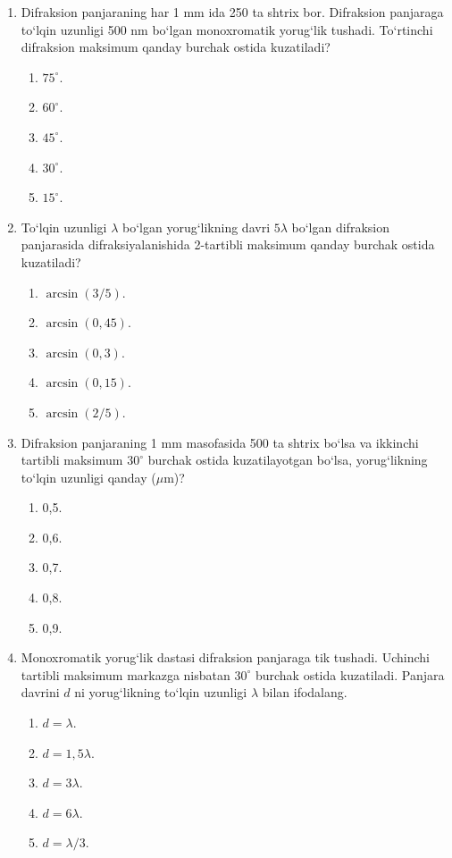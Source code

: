 \begin{enumerate}
\item Difraksion panjaraning har 1 mm ida 250 ta shtrix bor. Difraksion panjaraga to‘lqin uzunligi 500 nm bo‘lgan monoxromatik yorug‘lik tushadi. To‘rtinchi difraksion maksimum qanday burchak ostida kuzatiladi?
\begin{enumerate}[label=\Alph*)]
\item $75^\circ$.
\item $60^\circ$.
\item $45^\circ$.
\item $30^\circ$.
\item $15^\circ$.
\end{enumerate}

\item To‘lqin uzunligi $\lambda$ bo‘lgan yorug‘likning davri $5\lambda$ bo‘lgan difraksion panjarasida difraksiyalanishida 2-tartibli maksimum qanday burchak ostida kuzatiladi?
\begin{enumerate}[label=\Alph*)]
\item $\arcsin(3/5)$.
\item $\arcsin(0{,}45)$.
\item $\arcsin(0{,}3)$.
\item $\arcsin(0{,}15)$.
\item $\arcsin(2/5)$.
\end{enumerate}

\item Difraksion panjaraning 1 mm masofasida 500 ta shtrix bo‘lsa va ikkinchi tartibli maksimum $30^\circ$ burchak ostida kuzatilayotgan bo‘lsa, yorug‘likning to‘lqin uzunligi qanday ($\mu$m)?
\begin{enumerate}[label=\Alph*)]
\item 0,5.
\item 0,6.
\item 0,7.
\item 0,8.
\item 0,9.
\end{enumerate}

\item Monoxromatik yorug‘lik dastasi difraksion panjaraga tik tushadi. Uchinchi tartibli maksimum markazga nisbatan $30^\circ$ burchak ostida kuzatiladi. Panjara davrini $d$ ni yorug‘likning to‘lqin uzunligi $\lambda$ bilan ifodalang.
\begin{enumerate}[label=\Alph*)]
\item $d=\lambda$.
\item $d=1{,}5\lambda$.
\item $d=3\lambda$.
\item $d=6\lambda$.
\item $d=\lambda/3$.
\end{enumerate}


\end{enumerate}
